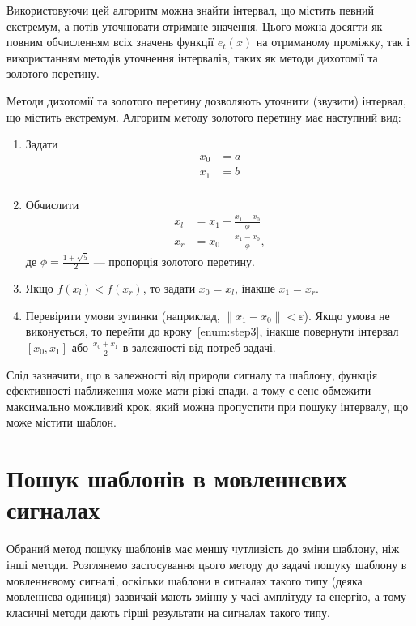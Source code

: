        Використовуючи цей алгоритм можна знайти інтервал, що містить певний екстремум, а потів уточнювати отримане
        значення.
        Цього можна досягти як повним обчисленням всіх значень функції $e_t(x)$ на отриманому проміжку, так і
        використанням методів уточнення інтервалів, таких як методи дихотомії та золотого перетину.

        Методи дихотомії та золотого перетину дозволяють уточнити (звузити) інтервал, що містить екстремум.
        Алгоритм методу золотого перетину має наступний вид:
        \begin{enumerate}
            \item Задати
                \begin{align*}
                    x_0 &= a\\
                    x_1 &= b\\
                \end{align*}
            \item Обчислити
                \begin{align*}
                    x_l &= x_1 - \frac{x_1 - x_0}{\phi}\\
                    x_r &= x_0 + \frac{x_1 - x_0}{\phi},
                \end{align*}
                де $\phi = \frac{1 + \sqrt{ 5 }}{2}$ --- пропорція золотого перетину.
            \item\label{enum:step3} Якщо $f(x_l) < f(x_r)$, то задати $x_0 = x_l$, інакше $x_1 = x_r$.
            \item Перевірити умови зупинки (наприклад, $\|x_1 - x_0\| < \varepsilon$).
                Якщо умова не виконується, то перейти до кроку~\ref{enum:step3}, інакше повернути інтервал ${[x_0,
                    x_1]}$ або $\frac{x_0+x_1}{2}$ в залежності від потреб задачі.
        \end{enumerate}

        Слід зазначити, що в залежності від природи сигналу та шаблону, функція ефективності наближення може мати
        різкі спади, а тому є сенс обмежити максимально можливий крок, який можна пропустити при пошуку інтервалу, що
        може містити шаблон.
\section{Пошук шаблонів в мовленнєвих сигналах}
    Обраний метод пошуку шаблонів має меншу чутливість до зміни шаблону, ніж інші методи.
    Розглянемо застосування цього методу до задачі пошуку шаблону в мовленнєвому сигналі, оскільки шаблони в сигналах
    такого типу (деяка мовленнєва одиниця) зазвичай мають змінну у часі амплітуду та енергію, а тому класичні методи
    дають гірші результати на сигналах такого типу.

